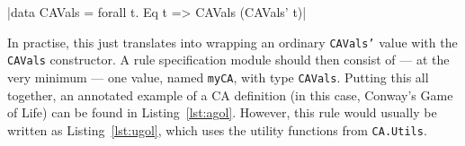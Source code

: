 \documentclass[oneside,a4paper]{memoir}
\begin{document}
|data CAVals = forall t. Eq t => CAVals (CAVals' t)|

In practise, this just translates into
  wrapping an ordinary \texttt{CAVals'} value with the \texttt{CAVals} constructor.
A rule specification module should then consist of
  --- at the very minimum ---
  one value, named \texttt{myCA}\footnotemark, with type \texttt{CAVals}.
Putting this all together,
  an annotated example of a CA definition (in this case, Conway's Game of Life) can be found in Listing~\ref{lst:agol}.
However, this rule would usually be written as Listing~\ref{lst:ugol},
  which uses the utility functions from \texttt{CA.Utils}.

\end{document}
